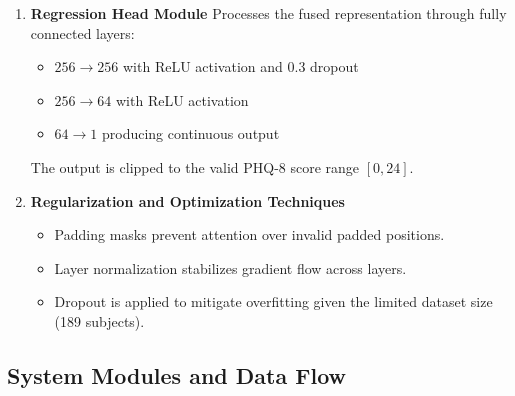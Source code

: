 \documentclass[12pt]{article}
\begin{document}
\begin{enumerate}
\begin{itemize}
        \item \textbf{Bidirectional LSTM:} Includes 1--2 layers with 256 hidden units per direction (512-dimensional combined output). It models local temporal dependencies not fully captured by the transformer.
        
        \item \textbf{Attention-based Temporal Pooling:} Assigns learned weights to each timestep, emphasizing relevant segments while reducing the influence of silence or padded regions.
        
        \item \textbf{Multimodal Fusion:} Each modality is projected into a 256-dimensional space using linear layers with ReLU activation and layer normalization. These are treated as tokens and processed using multi-head attention (4 heads). Final attention pooling produces a unified 256-dimensional representation.
    \end{itemize}

    \item \textbf{Regression Head Module}  
    Processes the fused representation through fully connected layers:
    \begin{itemize}
        \item $256 \rightarrow 256$ with ReLU activation and 0.3 dropout
        \item $256 \rightarrow 64$ with ReLU activation
        \item $64 \rightarrow 1$ producing continuous output
    \end{itemize}
    The output is clipped to the valid PHQ-8 score range $[0, 24]$.

    \item \textbf{Regularization and Optimization Techniques}  
    \begin{itemize}
        \item Padding masks prevent attention over invalid padded positions.
        \item Layer normalization stabilizes gradient flow across layers.
        \item Dropout is applied to mitigate overfitting given the limited dataset size (189 subjects).
    \end{itemize}

\end{enumerate}

	\subsection{System Modules and Data Flow}
\end{document}
